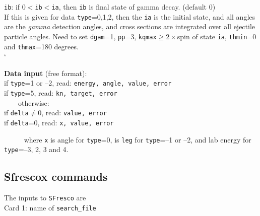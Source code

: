 \documentclass[11pt]{article}
\begin{document}
{\tt ib}: if 0$<${\tt ib}$<${\tt ia}, then {\tt ib} is final state of gamma decay. (default 0)\\
     If this is given for data {\tt type}=0,1,2, then the {\tt ia} is the initial state, and 
     all angles are the {\em  gamma} detection angles, and cross sections are integrated over all ejectile particle angles.
     Need to set {\tt dgam}=1, {\tt pp}=3, {\tt kqmax}$\geq 2\times$spin of state {\tt ia}, 
        {\tt thmin}=0 and {\tt thmax}=180 degrees.\\`

{\bf Data input} (free format):
\\ if {\tt type}=1 or --2, read:  {\tt energy, angle, value, error}
\\ if {\tt type}=5, read:  {\tt kn, target, error}
\\ ~~~~otherwise:
\\ if {\tt delta}$\ne$0, read:  {\tt value, error}
\\ if {\tt delta}=0, read:  {\tt x, value, error}


~~~~~ where {\tt x} is angle for {\tt type}=0, is {\tt leg} for {\tt type}=--1 or --2, and lab energy for {\tt type}=--3, 2, 3 and 4.\\

\subsection{Sfrescox commands}

The inputs to {\tt SFresco} are\\
Card 1: name of {\tt search\_file}\\
\end{document}

